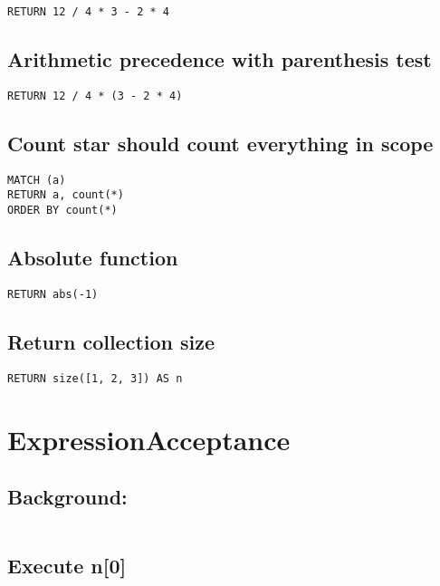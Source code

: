 \begin{lstlisting}
RETURN 12 / 4 * 3 - 2 * 4
\end{lstlisting}

\subsection{Arithmetic precedence with parenthesis test}

\begin{lstlisting}
RETURN 12 / 4 * (3 - 2 * 4)
\end{lstlisting}

\subsection{Count star should count everything in scope}

\begin{lstlisting}
MATCH (a)
RETURN a, count(*)
ORDER BY count(*)
\end{lstlisting}

\subsection{Absolute function}

\begin{lstlisting}
RETURN abs(-1)
\end{lstlisting}

\subsection{Return collection size}

\begin{lstlisting}
RETURN size([1, 2, 3]) AS n
\end{lstlisting}
\section{ExpressionAcceptance}


\subsection{Background:}

\begin{lstlisting}
\end{lstlisting}

\subsection{Execute n[0]}

